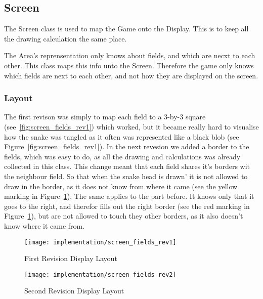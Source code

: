 \subsection{Screen}

The Screen class is used to map the Game onto the Display. This is to keep all the drawing calculation the same place.

The Area's reprensentation only knows about fields, and which are necxt to each other. This class maps this info unto the Screen. Therefore the game only knows which fields are next to each other, and not how they are displayed on the screen.

\subsubsection{Layout}

The first revison was simply to map each field to a 3-by-3 square (see~\ref{fig:screen_fields_rev1}) which worked, but it became really hard to visualise how the snake was tangled as it often was represented like a black blob (see Figure~\ref{fig:screen_fields_rev1}). In the next revesion we added a border to the fields, which was easy to do, as all the drawing and calculations was already collected in this class. This change meant that each field shares it's borders wit the neighbour field. So that when the snake head is drawn' it is not allowed to draw in the border, as it does not know from where it came (see the yellow marking in Figure~\ref{fig:screen_fields_rev2}). The same applies to the part before. It knows only that it goes to the right, and therefor fills out the right border (see the red marking in Figure~\ref{fig:screen_fields_rev2}), but are not allowed to touch they other borders, as it also doesn't know where it came from.

\begin{figure}
\centering
\begin{minipage}{.5\textwidth}
  \centering
	\texttt{[image: implementation/screen\_fields\_rev1]}
	\caption{First Revision Display Layout}
	\label{fig:screen_fields_rev1}
\end{minipage}%
\begin{minipage}{.5\textwidth}
  \centering
	\texttt{[image: implementation/screen\_fields\_rev2]}
	\caption{Second Revision Display Layout}
	\label{fig:screen_fields_rev2}
\end{minipage}
\end{figure}

